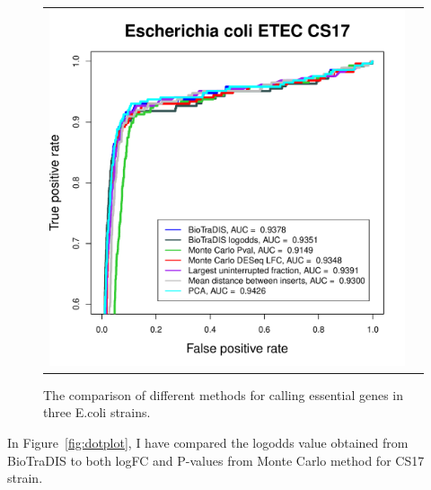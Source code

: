\documentclass[12pt,letterpaper]{article}
\begin{document}
\begin{figure}
\begin{tabular}{c c}
\includegraphics[page=1, scale=0.5]{essential-call-comparison-CS17.pdf} &\\
\end{tabular}
\caption{The comparison of different methods for calling essential genes in three E.coli strains.}
\label{fig:roc}
\end{figure}

In Figure~\ref{fig:dotplot}, I have compared the logodds value obtained from BioTraDIS to both logFC and P-values from Monte Carlo method for CS17 strain.
\end{document}

